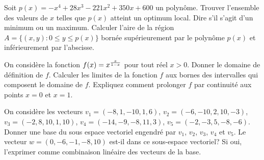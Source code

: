 
\begin{question}
Soit $p(x)=- x^{4} + 28 x^{3} - 221 x^{2} + 350 x + 600$ un polynôme. Trouver
l'ensemble des valeurs de $x$ telles que $p(x)$ atteint un optimum local. Dire
s'il s'agit d'un minimum ou un maximum. Calculer l'aire de la région
$A=\{(x,y):0\leq y\leq p(x)\}$ bornée supérieurement par le polynôme $p(x)$ et
inférieurement par l'abscisse.
\end{question}

\begin{question}
On considère la fonction $f(x)=x^{x\over 1-x}$ pour tout réel $x>0$. Donner le
domaine de définition de $f$. Calculer les limites de la fonction $f$ aux bornes
des intervalles qui composent le domaine de $f$. Expliquez comment prolonger $f$
par continuité aux points $x=0$ et $x=1$.
\end{question}


\begin{question}
On considère les vecteurs
$v_1=(-8, 1, -10, 1, 6)$,
$v_2=(-6, -10, 2, 10, -3)$,
$v_3=(-2, 8, 10, 1, 10)$,
$v_4=(-14, -9, -8, 11, 3)$,
$v_5=(-2, -3, 5, -8, -6)$.
Donner une base du sous espace vectoriel engendré par $v_1$, $v_2$, $v_3$, $v_4$
et $v_5$.
Le vecteur $w=(0, -6, -1, -8, 10)$
est-il dans ce sous-espace vectoriel? Si oui, l'exprimer  comme combinaison
linéaire des vecteurs de la base.
\end{question}



